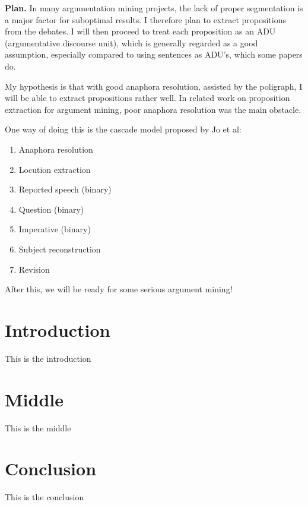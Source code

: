 \UseRawInputEncoding


\textbf{Plan.} In many argumentation mining projects, the lack of proper segmentation is a major factor for suboptimal results. I therefore plan to extract propositions from the debates. I will then proceed to treat each proposition as an ADU (argumentative discourse unit), which is generally regarded as a good assumption, especially compared to using sentences as ADU's, which some papers do.

My hypothesis is that with good anaphora resolution, assisted by the poligraph, I will be able to extract propositions rather well. In related work on proposition extraction for argument mining, poor anaphora resolution was the main obstacle.

One way of doing this is the cascade model proposed by Jo et al:

\begin{enumerate}
    \item Anaphora resolution
    \item Locution extraction
    \item Reported speech (binary)
    \item Question (binary)
    \item Imperative (binary)
    \item Subject reconstruction
    \item Revision
\end{enumerate}

After this, we will be ready for some serious argument mining!

\section{Introduction}

This is the introduction

\section{Middle}

This is the middle

\section{Conclusion}

This is the conclusion